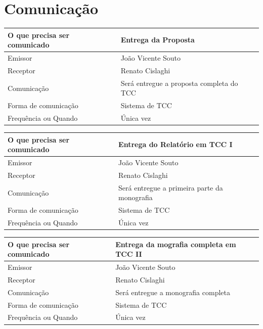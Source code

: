 \documentclass[
	12pt,				%
	openright,			%
	twoside,			%
	a4paper,			%
	english,			%
	brazil,				%
	]{abntex2}
\begin{document}
\section{Comunicação}

\begin{center}
\begin{tabular}{|l|p{9cm}|}
\hline
    O que precisa ser comunicado & Entrega da Proposta \\ \hline
    Emissor & João Vicente Souto \\ \hline
    Receptor & Renato Cislaghi \\ \hline
    Comunicação & Será entregue a proposta completa do TCC \\ \hline
    Forma de comunicação & Sistema de TCC \\ \hline
    Frequência ou Quando & Única vez \\ \hline
\end{tabular}
\end{center}

\begin{center}
\begin{tabular}{|l|p{9cm}|}
\hline
    O que precisa ser comunicado & Entrega do Relatório em TCC I \\ \hline
    Emissor & João Vicente Souto \\ \hline
    Receptor & Renato Cislaghi \\ \hline
    Comunicação & Será entregue a primeira parte da monografia \\ \hline
    Forma de comunicação & Sistema de TCC \\ \hline
    Frequência ou Quando & Única vez \\ \hline
\end{tabular}
\end{center}

\begin{center}
\begin{tabular}{|l|p{9cm}|}
\hline
    O que precisa ser comunicado & Entrega da mografia completa em TCC II \\ \hline
    Emissor & João Vicente Souto \\ \hline
    Receptor & Renato Cislaghi \\ \hline
    Comunicação & Será entregue a monografia completa \\ \hline
    Forma de comunicação & Sistema de TCC \\ \hline
    Frequência ou Quando & Única vez \\ \hline
\end{tabular}
\end{center}
\end{document}
